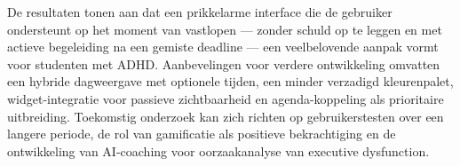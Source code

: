 De resultaten tonen aan dat een prikkelarme interface die de gebruiker
ondersteunt op het moment van vastlopen — zonder schuld op te leggen en met
actieve begeleiding na een gemiste deadline — een veelbelovende aanpak vormt
voor studenten met ADHD. Aanbevelingen voor verdere ontwikkeling omvatten een
hybride dagweergave met optionele tijden, een minder verzadigd kleurenpalet,
widget-integratie voor passieve zichtbaarheid en agenda-koppeling als
prioritaire uitbreiding. Toekomstig onderzoek kan zich richten op
gebruikerstesten over een langere periode, de rol van gamificatie als positieve
bekrachtiging en de ontwikkeling van AI-coaching voor oorzaakanalyse van
executive dysfunction.